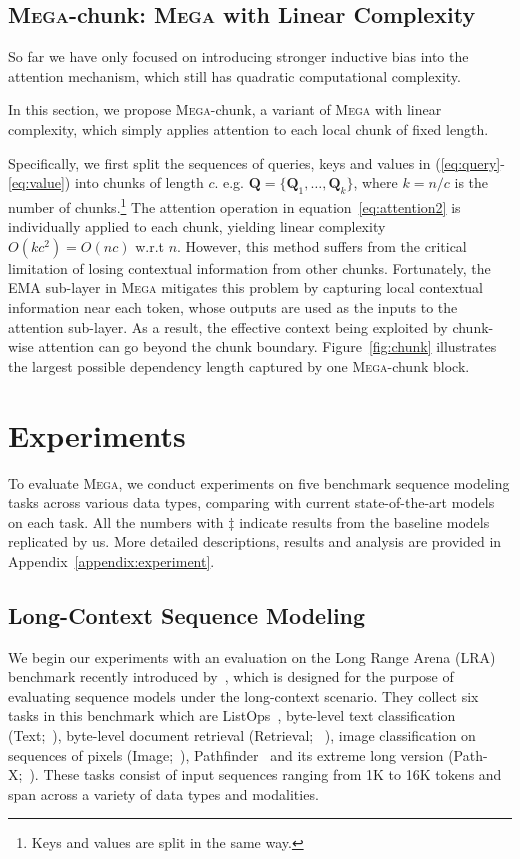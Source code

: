\subsection{\textsc{Mega}-chunk: \textsc{Mega} with Linear Complexity}
\label{subsec:mega-chunk}
So far we have only focused on introducing stronger inductive bias into the attention mechanism, which still has quadratic computational complexity.

In this section, we propose \textsc{Mega}-chunk, a variant of \textsc{Mega} with linear complexity, which simply applies attention to each local chunk of fixed length.

Specifically, we first split the sequences of queries, keys and values in (\ref{eq:query}-\ref{eq:value}) into chunks of length $c$. e.g. $\boldsymbol{Q} = \{\boldsymbol{Q}_1, \ldots,  \boldsymbol{Q}_k\}$, where $k = n/c$ is the number of chunks.\footnote{Keys and values are split in the same way.} The attention operation in equation~\ref{eq:attention2} is individually applied to each chunk, yielding linear complexity $O(kc^2)=O(nc)$ w.r.t $n$. However, this method suffers from the critical limitation of losing contextual information from other chunks. Fortunately, the EMA sub-layer in \textsc{Mega} mitigates this problem by capturing local contextual information near each token, whose outputs are used as the inputs to the attention sub-layer. As a result, the effective context being exploited by chunk-wise attention can go beyond the chunk boundary.
Figure~\ref{fig:chunk} illustrates the largest possible dependency length captured by one \textsc{Mega}-chunk block.

\section{Experiments}
\label{sec:experiments}
To evaluate \textsc{Mega}, we conduct experiments on five benchmark sequence modeling tasks across various data types, comparing with current state-of-the-art models on each task. All the numbers with $\ddag$ indicate results from the baseline models replicated by us. More detailed descriptions, results and analysis are provided in Appendix~\ref{appendix:experiment}.

\subsection{Long-Context Sequence Modeling}
\label{subsec:lra}
We begin our experiments with an evaluation on the Long Range Arena (LRA) benchmark recently introduced by~\citet{tay2021long}, which is designed for the purpose of evaluating sequence models under the long-context scenario. They collect six tasks in this benchmark which are ListOps~\citep{nangia2018listops}, byte-level text classification (Text;~\citet{maas2011learning}), byte-level document retrieval (Retrieval; ~\citet{radev2013acl}), image classification on sequences of pixels (Image;~\citet{krizhevsky2009learning}), Pathfinder~\citep{drew2018advances} and its extreme long version (Path-X;~\citet{tay2021long}). 
These tasks consist of input sequences ranging from 1K to 16K tokens and span across a variety of data types and modalities.

